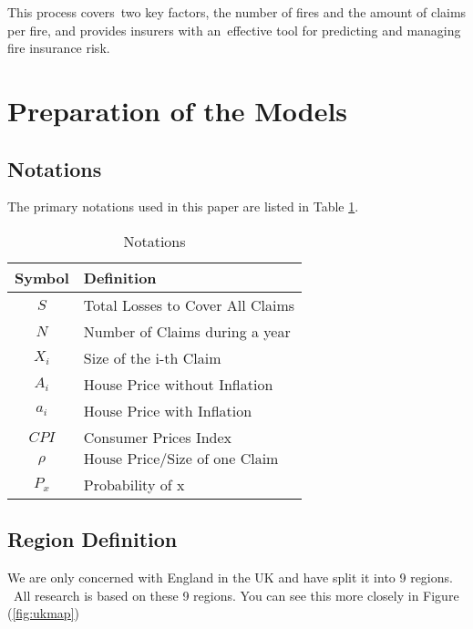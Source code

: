 \documentclass[12pt]{article}  %
\begin{document}
This process covers\
two key factors, the number of fires and the amount of claims per fire, and provides insurers with an\ 
effective tool for predicting and managing fire insurance risk.

\section{Preparation of the Models}

\subsection{Notations}
The primary notations used in this paper are listed in Table \ref{tb:notation}.

\begin{table}[!htbp]
\begin{center}
\caption{Notations}
\begin{tabular}{cl}
	\toprule
	\multicolumn{1}{m{3cm}}{\centering Symbol}
	&\multicolumn{1}{m{8cm}}{\centering Definition}\\
	\midrule
	$S$&Total Losses to Cover All Claims\\
	$N$&Number of Claims during a year\\
	$X_i$ &Size of the i-th Claim\\
    $A_i$ &House Price without Inflation\\
    $a_i$ &House Price with Inflation\\
    $CPI$ &Consumer Prices Index \\
	$\rho$ & $\text{House Price} / \text{Size of one Claim}$ \\
    $P_{x}$ & Probability of x \\
	\bottomrule
\end{tabular}\label{tb:notation}
\end{center}
\end{table}


\subsection{Region Definition}

We are only concerned with England in the UK and have split it into 9 regions. \
All research is based on these 9 regions. You can see this more closely in Figure (\ref{fig:ukmap})
\end{document}
